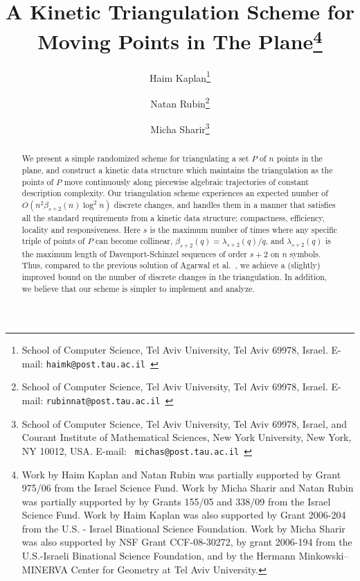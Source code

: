 \documentclass[11pt]{article}
\begin{document}
\begin{titlepage}
\title{A Kinetic Triangulation Scheme for Moving Points in The Plane\thanks{Work by Haim Kaplan and Natan Rubin was partially supported by Grant 975/06 from the
Israel Science Fund. Work by Micha Sharir and Natan Rubin was partially supported by
by Grants 155/05 and 338/09 from the Israel Science Fund. Work by Haim Kaplan was also supported by Grant 2006-204 from the U.S. - Israel Binational Science Foundation. Work by Micha Sharir was also supported by
NSF Grant CCF-08-30272, by grant 2006-194 from the U.S.-Israeli 
Binational Science Foundation, 
and by the Hermann Minkowski--MINERVA
Center for Geometry at Tel Aviv University.}}

\author{
Haim Kaplan\thanks{School of Computer Science, Tel Aviv University, Tel Aviv 69978,
Israel. 
E-mail: {\tt haimk@post.tau.ac.il }} \and
Natan Rubin\thanks{School of Computer Science, Tel Aviv University, Tel Aviv 69978,
Israel. 
E-mail: {\tt rubinnat@post.tau.ac.il }} \and
Micha Sharir\thanks{School of Computer Science, Tel Aviv University, Tel Aviv 69978,
Israel, and Courant Institute of Mathematical Sciences, New York
University, New York, NY 10012, USA. E-mail: {\tt
michas@post.tau.ac.il }} }
\maketitle

\begin{abstract}
We present a simple randomized scheme for triangulating a set $P$
of $n$ points in the plane, and construct a kinetic data structure 
which maintains the triangulation as the points of $P$ move
continuously along piecewise algebraic trajectories of constant
description complexity. Our triangulation scheme experiences an expected number of $O(n^2\beta_{s+2}(n)\log^2n)$ discrete changes, and handles them in a
manner that satisfies all the standard requirements from a kinetic
data structure: compactness, efficiency, locality and responsiveness. Here $s$ is the maximum number of times where any specific triple of points of $P$ can become collinear, $\beta_{s+2}(q)=\lambda_{s+2}(q)/q$, and $\lambda_{s+2}(q)$ is the maximum length of Davenport-Schinzel sequences of order $s+2$ on $n$ symbols. 
Thus, compared to the previous solution of Agarwal et al.~\cite{AWY}, we achieve a (slightly) improved bound on the number of discrete changes in the triangulation.
In addition, we believe that our scheme is simpler to implement and analyze.
\end{abstract}
\end{titlepage}
\end{document}
